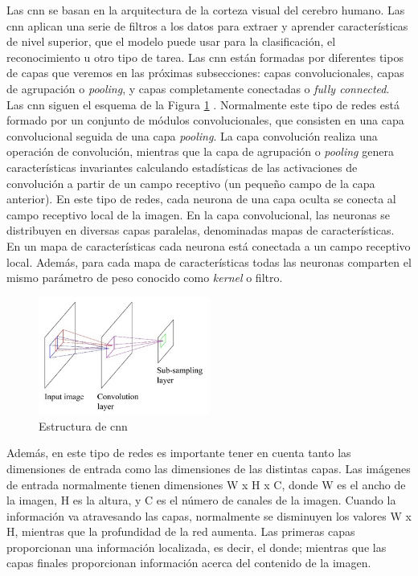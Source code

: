 Las \acrshort{cnn} se basan en la arquitectura de la corteza visual del cerebro humano. Las \acrshort{cnn} aplican una serie de filtros a los datos para extraer y aprender características de nivel superior, que el modelo puede usar para la clasificación, el reconocimiento u otro tipo de tarea. Las \acrshort{cnn} están formadas por diferentes tipos de capas que veremos en las próximas subsecciones: capas convolucionales, capas de agrupación o \textit{pooling}, y capas completamente conectadas o \textit{fully connected}. \\

Las \acrshort{cnn} siguen el esquema de la Figura \ref{fig.arquitectura_cnn} \cite{rna8}. Normalmente este tipo de redes está formado por un conjunto de módulos convolucionales, que consisten en una capa convolucional seguida de una capa \textit{pooling}. La capa convolución realiza una operación de convolución, mientras que la capa de agrupación o \textit{pooling} genera características invariantes calculando estadísticas de las activaciones de convolución a partir de un campo receptivo (un pequeño campo de la capa anterior). En este tipo de redes, cada neurona de una capa oculta se conecta al campo receptivo local de la imagen. En la capa convolucional, las neuronas se distribuyen en diversas capas paralelas, denominadas mapas de características. En un mapa de características cada neurona está conectada a un campo receptivo local. Además, para cada mapa de características todas las neuronas comparten el mismo parámetro de peso conocido como \textit{kernel} o filtro.\\


\begin{figure}[H]
  \begin{center}
    \includegraphics[width=0.5\textwidth]{figures/Introduccion/arquitectura_cnn.png}
		\caption{Estructura de \acrshort{cnn}}
		\label{fig.arquitectura_cnn}
		\end{center}
\end{figure}

Además, en este tipo de redes es importante tener en cuenta tanto las dimensiones de entrada como las dimensiones de las distintas capas. Las imágenes de entrada normalmente tienen dimensiones W x H x C, donde W es el ancho de la imagen, H es la altura, y C es el número de canales de la imagen. Cuando la información va atravesando las capas, normalmente se disminuyen los valores W x H, mientras que la profundidad de la red aumenta. Las primeras capas proporcionan una información localizada, es decir, el donde; mientras que las capas finales proporcionan información acerca del contenido de la imagen.


